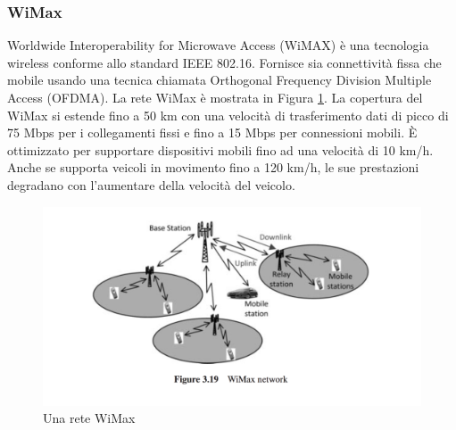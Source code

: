 \subsubsection{WiMax}
Worldwide Interoperability for Microwave Access (WiMAX) è una tecnologia wireless conforme allo standard IEEE 802.16. Fornisce sia connettività fissa che mobile usando una tecnica chiamata Orthogonal Frequency Division Multiple Access (OFDMA). La rete WiMax è mostrata in Figura \ref{fig:wim}. La copertura del WiMax si estende fino a 50 km con una velocità di trasferimento dati di picco di 75 Mbps per i collegamenti fissi e fino a 15 Mbps per connessioni mobili. È ottimizzato per supportare dispositivi mobili fino ad una velocità di 10 km/h. Anche se supporta veicoli in movimento fino a 120 km/h, le sue prestazioni degradano con l'aumentare della velocità del veicolo.
\begin{figure}[h]
	\centering
	\includegraphics[scale=0.350]{imgs/wim.png}
	\caption{Una rete WiMax} \label{fig:wim}
\end{figure}
